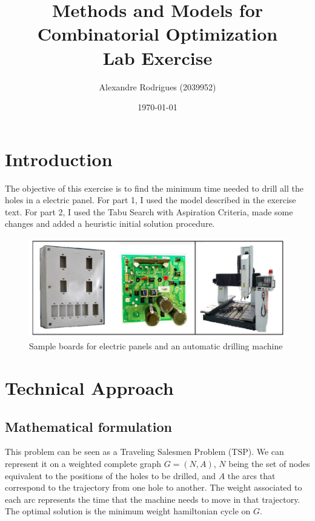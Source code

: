 \documentclass[a4paper,12pt]{article}
\begin{document}
	
	\title{{\Huge Methods and Models for \\ Combinatorial Optimization} \\ Lab Exercise}
	\author{ Alexandre Rodrigues (2039952)}
	\date{\today}
	\maketitle
	
	
	\section*{Introduction}
		The objective of this exercise is to find the minimum time needed to drill all the holes in a electric panel.
		For part 1, I used the model described in the exercise text.
		For part 2, I used the Tabu Search with Aspiration Criteria, made some changes and added a heuristic initial solution procedure.
		
		\vspace{3cm}
		
		\begin{figure}[H]
			\centering
			\includegraphics[width=.99\linewidth]{pic1.png}  
			\caption{Sample boards for electric panels and an automatic drilling machine}
			\label{fig:fig1}
		\end{figure}
	
	\pagebreak
	
	\tableofcontents
	
	\pagebreak
		
		
	\section{Technical Approach}
	
		\subsection{Mathematical formulation}
			This problem can be seen as a Traveling Salesmen Problem (TSP).
			We can represent it on a weighted complete graph $ G =(N,A) $, $ N $ being the set of nodes equivalent to the positions of the holes to be drilled, and $ A $ the arcs that correspond to the trajectory from one hole to another.
			The weight associated to each arc represents the time that the machine needs to move in that trajectory.
			The optimal solution is the minimum weight hamiltonian cycle on $ G $.
			
\end{document}
